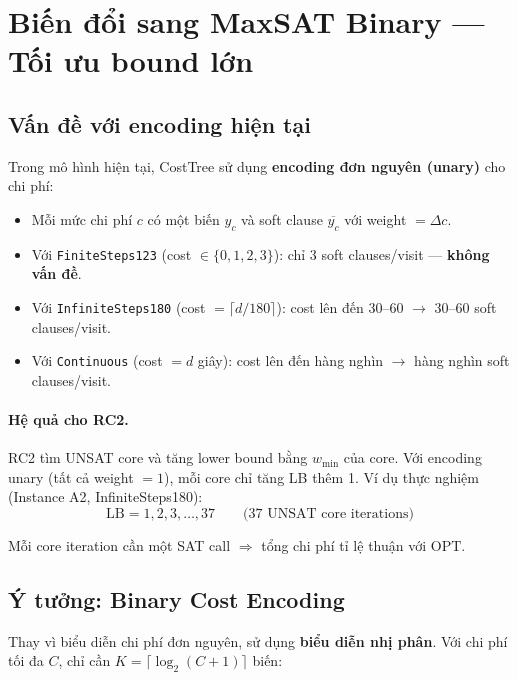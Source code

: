 \documentclass[11pt,a4paper]{article}
\begin{document}
\section{Biến đổi sang MaxSAT Binary --- Tối ưu bound lớn}
\label{sec:binary-maxsat}

\subsection{Vấn đề với encoding hiện tại}

Trong mô hình hiện tại, CostTree sử dụng \textbf{encoding đơn nguyên (unary)} cho chi phí:
\begin{itemize}
  \item Mỗi mức chi phí $c$ có một biến $y_c$ và soft clause $\overline{y_c}$ với weight $= \Delta c$.
  \item Với \texttt{FiniteSteps123} (cost $\in \{0,1,2,3\}$): chỉ 3 soft clauses/visit --- \textbf{không vấn đề}.
  \item Với \texttt{InfiniteSteps180} (cost $= \lceil d/180 \rceil$): cost lên đến 30--60 $\to$ 30--60 soft clauses/visit.
  \item Với \texttt{Continuous} (cost $= d$ giây): cost lên đến hàng nghìn $\to$ hàng nghìn soft clauses/visit.
\end{itemize}

\paragraph{Hệ quả cho RC2.} RC2 tìm UNSAT core và tăng lower bound bằng $w_{\min}$ của core. Với encoding unary (tất cả weight $= 1$), mỗi core chỉ tăng LB thêm 1. Ví dụ thực nghiệm (Instance A2, InfiniteSteps180):
\[
\text{LB} = 1, 2, 3, \ldots, 37 \qquad \text{(37 UNSAT core iterations)}
\]

Mỗi core iteration cần một SAT call $\Rightarrow$ tổng chi phí tỉ lệ thuận với $\text{OPT}$.

\subsection{Ý tưởng: Binary Cost Encoding}

Thay vì biểu diễn chi phí đơn nguyên, sử dụng \textbf{biểu diễn nhị phân}. Với chi phí tối đa $C$, chỉ cần $K = \lceil \log_2(C+1) \rceil$ biến:
\end{document}
